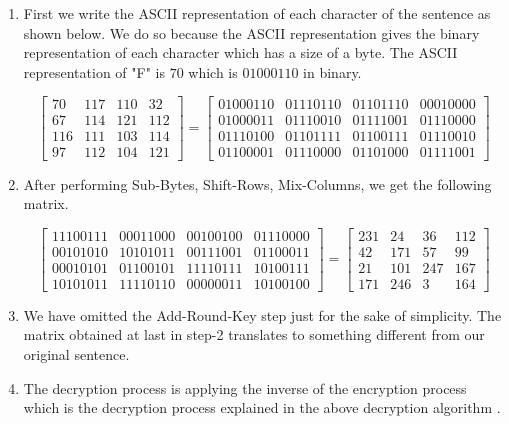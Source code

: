 \begin{enumerate}
\item First we write the ASCII representation of each character of the sentence as shown below. We do so because the ASCII representation gives the binary representation of each character which has a size of a byte. The ASCII representation of "F" is \(70\) which is \(01000110\) in binary.\vspace{2mm}

  \[\begin{bmatrix}
      70 & 117 & 110 & 32 \\
      67 & 114 & 121 & 112\\
      116 & 111 & 103 & 114 \\
      97 & 112 & 104 & 121
    \end{bmatrix}=
    \begin{bmatrix}
      01000110 & 01110110 & 01101110 & 00010000 \\
      01000011 & 01110010 & 01111001 & 01110000\\
      01110100 & 01101111 & 01100111 & 01110010 \\
      01100001 & 01110000 & 01101000 & 01111001
    \end{bmatrix}
  \]

  \vspace{5mm}

\item After performing Sub-Bytes, Shift-Rows, Mix-Columns, we get the following matrix. \vspace{2mm}

  \[\begin{bmatrix}
      11100111 & 00011000 & 00100100 & 01110000\\
      00101010 & 10101011 & 00111001 & 01100011\\
      00010101 & 01100101 & 11110111 & 10100111\\
      10101011 & 11110110 & 00000011 & 10100100
    \end{bmatrix}=
    \begin{bmatrix}
      231 & 24 & 36 & 112\\
      42 & 171 & 57 & 99\\
      21 & 101 & 247 & 167\\
      171 & 246 & 3 & 164
    \end{bmatrix}
  \]
\clearpage

\item We have omitted the Add-Round-Key step just for the sake of simplicity. The matrix obtained at last in step-2 translates to something different from our original sentence.

  \vspace{5mm}

\item The decryption process is applying the inverse of the encryption process which is the decryption process explained in the above decryption algorithm \cite{aes}.
\end{enumerate}
